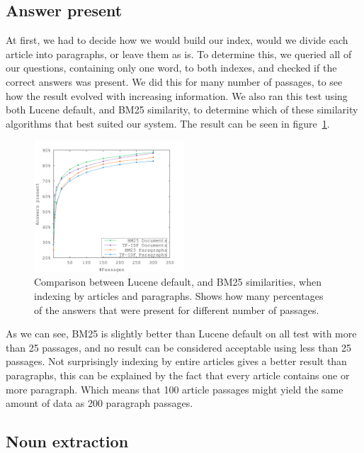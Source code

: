 \subsection{Answer present}
At first, we had to decide how we would build our index, would we divide each article into paragraphs, or leave them as is. 
To determine this, we queried all of our questions, containing only one word, to both indexes, and checked if the correct answers was present.
We did this for many number of passages, to see how the result evolved with increasing information.
We also ran this test using both Lucene default, and BM25 similarity, to determine which of these similarity algorithms that best suited our system.
The result can be seen in figure~\ref{fig:bm25_tfdf}.

\begin{figure}[h!]
  \centering
  \includegraphics[width=0.5\textwidth]{figures/bm25_tfdf.pdf}
  \caption{Comparison between Lucene default, and BM25 similarities, when indexing by articles and paragraphs. 
  Shows how many percentages of the answers that were present for different number of passages.}
  \label{fig:bm25_tfdf}
\end{figure}

As we can see, BM25 is slightly better than Lucene default on all test with more than 25 passages, and no result can be 
considered acceptable using less than 25 passages.
Not surprisingly indexing by entire articles gives a better result than paragraphs, 
this can be explained by the fact that every article contains one or more paragraph. 
Which means that 100 article passages might yield the same amount of data as 200 paragraph passages.

\subsection{Noun extraction}

